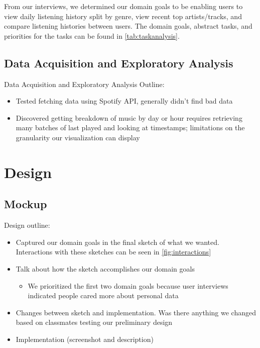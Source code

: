\documentclass[journal]{vgtc}                %
\begin{document}


From our interviews, we determined our domain goals to be enabling users to view daily listening history split by genre, view recent top artists/tracks, and compare listening histories between users. The domain goals, abstract tasks, and priorities for the tasks can be found in \autoref{tab:taskanalysis}.





\subsection{Data Acquisition and Exploratory Analysis}
Data Acquisition and Exploratory Analysis Outline:
\begin{itemize}
  \item Tested fetching data using Spotify API, generally didn't find bad data
  \item Discovered getting breakdown of music by day or hour requires retrieving many batches of last played and looking at timestamps; limitations on the granularity our visualization can display
\end{itemize}

\section{Design}

\subsection{Mockup}


Design outline:
\begin{itemize}
  \item Captured our domain goals in the final sketch of what we wanted. Interactions with these sketches can be seen in \autoref{fig:interactions}
  \item Talk about how the sketch accomplishes our domain goals
  \begin{itemize}
    \item We prioritized the first two domain goals because user interviews indicated people cared more about personal data
  \end{itemize}
  \item Changes between sketch and implementation. Was there anything we changed based on classmates testing our preliminary design
  \item Implementation (screenshot and description)
\end{itemize}
\end{document}

